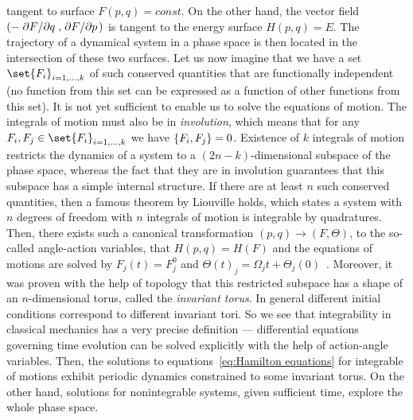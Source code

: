 tangent to surface \(F(p,q) = const\). On the other hand, the vector field 
\(\left(-\pdv*{F}{q},\pdv*{F}{p}\right)\) is tangent to the energy surface \(H(p,q) = E\).
The trajectory of a dynamical system in a phase space is then located in the intersection
of these two surfaces.
Let us now imagine that we have a set \(\set{F_i}_{i=1,\ldots,k}\) of such conserved
quantities that are functionally independent (no function from this set can be expressed
as a function of other functions from this set). It is not yet sufficient to enable us to solve
the equations of motion. The integrals of motion must also be in \textit{involution},
which means that for any \(F_i,F_j\in\set{F_i}_{i=1,\ldots,k}\) we have
\(\poissonbracket{F_i}{F_j} = 0\). Existence of \(k\) integrals of motion restricts
the dynamics of a system to a \((2n-k)\)-dimensional subspace of the phase space, whereas the fact
that they are in involution guarantees that this subspace has a simple internal structure.
If there are at least \(n\) such conserved quantities, then a famous theorem by
Liouville holds, which states a system with \(n\) degrees of freedom with
\(n\) integrals of motion is integrable by quadratures.
Then, there exists such a canonical transformation \((p,q)\to (F,\Theta)\), to the
so-called angle-action variables, that \(H(p,q) = H(F)\) and the equations
of motions are solved by \(F_j(t) = F_j^0\) and \(\Theta(t)_j = \Omega_j t + \Theta_j(0)\)~\autocite{arnold2013mathematical}.
Moreover, it was proven with the help of topology that this restricted subspace
has a shape of an \(n\)-dimensional torus, called the \textit{invariant torus}. In
general different initial conditions correspond to different invariant tori.
So we see that integrability in classical mechanics has a very precise 
definition --- differential equations governing time evolution can be solved explicitly
with the help of action-angle variables. Then, the solutions to equations~\ref{eq:Hamilton equations}
for integrable of motions exhibit periodic dynamics constrained to some invariant torus.
On the other hand, solutions for nonintegrable systems, given sufficient time, explore the whole
phase space.

